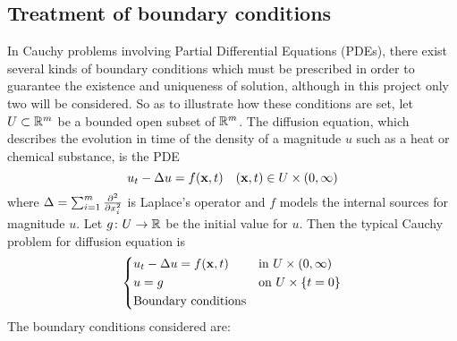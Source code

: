 
\subsection{Treatment of boundary conditions}

In Cauchy problems involving Partial Differential Equations (PDEs), there exist several kinds of boundary conditions which must be prescribed in order to guarantee the existence and uniqueness of solution, although in this project only two will be considered. So as to illustrate how these conditions are set, let $U \subset \mathbb{R}^m$ be a bounded open subset of $\mathbb{R}^m$. The diffusion equation, which describes the evolution in time of the density of a magnitude $u$ such as a heat or chemical substance, is the PDE
\begin{equation} \label{eq:boundary_conditions_heat_equation}
	u_t - \Delta u = f(\vb{x}, t) \quad (\vb{x}, t) \in U \times (0,\infty)
\end{equation}
where $\Delta = \sum_{i=1}^{m} \pdv[2]{}{x_i}$ is Laplace's operator and $f$ models the internal sources for magnitude $u$. Let $g \colon U \rightarrow \mathbb{R}$ be the initial value for $u$. Then the typical Cauchy problem for diffusion equation is
\begin{equation} \label{eq:boundary_conditions_problem}
	\left\{
	\begin{aligned}
		&u_t - \Delta u = f(\vb{x}, t) & &\text{in } U \times (0,\infty) \\
		&u = g & &\text{on } U \times \{ t = 0 \} \\
		&\text{Boundary conditions}
	\end{aligned}
	\right.
\end{equation}
The boundary conditions considered are:
